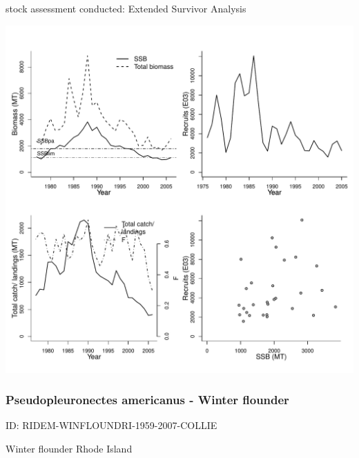 stock assessment conducted: Extended Survivor Analysis 
\begin{center}
\vspace{-0.2cm}\includegraphics[scale=0.65]{../tex/figures/plot-WGSSDS-PLAICCELT-1976-2006-JENNINGS.pdf}
\end{center}

\newpage
\subsubsection{Pseudopleuronectes americanus - Winter flounder}
ID: RIDEM-WINFLOUNDRI-1959-2007-COLLIE

Winter flounder Rhode Island 

